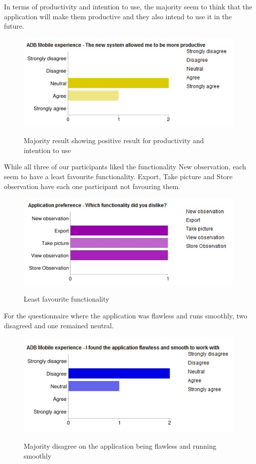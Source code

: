  In terms of productivity and intention to use, the majority seem to think that the application will make them productive and they also intend to use it in the future.
 
\begin{figure}[htb]
    \centering
    \includegraphics[scale=0.7]{ut_pic/productivityandintensiontouse1.jpg}
    \label{fig:Productivity and intention to use}
    \caption{Majority result showing positive result for productivity and intention to use}
\end{figure}

While all three of our participants liked the functionality New observation, each seem to have a least favourite functionality. Export, Take picture and Store observation have each one participant not favouring them.

\begin{figure}[htb]
    \centering
    \includegraphics[scale=0.7]{ut_pic/Functionalitydislike1.jpg}
    \label{fig:Functionality favourability}
    \caption{Least favourite functionality}
\end{figure}

For the questionnaire where the application was flawless and runs smoothly, two disagreed and one remained neutral.

\begin{figure}[htb]
    \centering
    \includegraphics[scale=0.6]{ut_pic/flawless1.jpg}
    \label{fig:App was flawless}
    \caption{Majority disagree on the application being flawless and running smoothly}
\end{figure}

